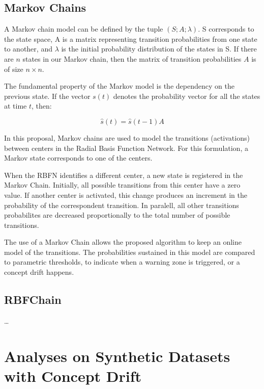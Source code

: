 \documentclass[preprint,12pt]{elsarticle}
\begin{document}
\subsection{Markov Chains}

A Markov chain model can be defined by the tuple $(S; A; \lambda)$. S corresponds to the state space, A is a matrix representing transition probabilities from one state to another, and $\lambda$ is the initial probability distribution of the states in S. If there are $n$ states in our Markov chain, then the
matrix of transition probabilities $A$ is of size $n \times n$.

The fundamental property of the Markov model is the dependency on the previous state. If the vector $s(t)$ denotes the probability vector for all the states at time $t$, then:

\begin{equation}
    \label{eq:markov}
    \hat { s } ( t ) = \hat { s } ( t - 1 ) A
\end{equation}

In this proposal, Markov chains are used to model the transitions (activations) between centers in the Radial Basis Function Network.
For this formulation, a Markov state corresponds to one of the centers.

When the RBFN identifies a different center, a new state is registered in the Markov Chain.
Initially, all possible transitions from this center have a zero value.
If another center is activated, this change produces an increment in the probability of the correspondent transition.
In paralell, all other transitions probabilites are decreased proportionally to the total number of possible transitions.

The use of a Markov Chain allows the proposed algorithm to keep an online model of the transitions. The probabilities sustained in this model are compared to parametric thresholds, to indicate when a warning zone is triggered, or a concept drift happens.

\subsection{RBFChain}

\ldots

\section{Analyses on Synthetic Datasets with Concept Drift}
\label{sec:results_synthetic_dataset}
\end{document}
